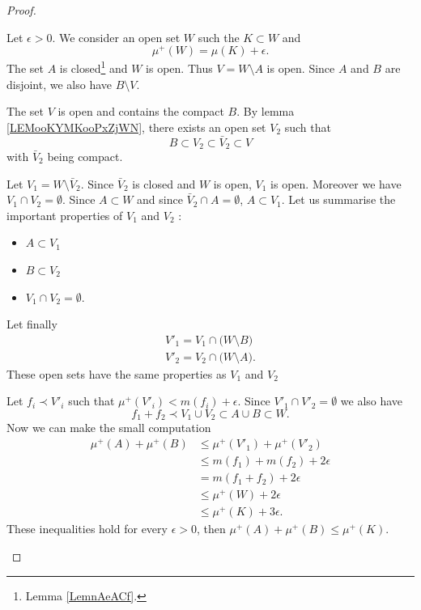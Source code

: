 \begin{proof}
\begin{subproof}
		Let \( \epsilon>0\). We consider an open set \( W\) such the \( K\subset W\) and
		\begin{equation}
			\mu^+(W)=\mu(K)+\epsilon.
		\end{equation}
		The set \( A\) is closed\footnote{Lemma \ref{LemnAeACf}.} and \( W\) is open. Thus \( V=W\setminus A\) is open. Since \( A\) and \( B\) are disjoint, we also have \( B\setminus V\).

		The set \( V\) is open and contains the compact \( B\). By lemma \ref{LEMooKYMKooPxZjWN}, there exists an open set \( V_2\) such that
		\begin{equation}
			B\subset V_2\subset \bar V_2\subset V
		\end{equation}
		with \( \bar V_2\) being compact.

		Let \( V_1=W\setminus \bar V_2\). Since \(  \bar V_2\) is closed and \( W\) is open, \( V_1\) is open. Moreover we have \( V_1\cap V_2=\emptyset\). Since \( A\subset W\) and since \( \bar V_2\cap A=\emptyset\), \( A\subset V_1\). Let us summarise the important properties of \( V_1\) and \( V_2\) :
		\begin{itemize}
			\item \( A\subset V_1\)
			\item \( B\subset V_2\)
			\item \( V_1\cap V_2=\emptyset\).
		\end{itemize}
		Let finally
		\begin{subequations}
			\begin{align}
				V'_1=V_1\cap\big( W\setminus B \big) \\
				V'_2=V_2\cap\big( W\setminus A \big).
			\end{align}
		\end{subequations}
		These open sets have the same properties as \( V_1\) and \( V_2\)

		Let \( f_i\prec V'_i\) such that \( \mu^+(V'_i)<m(f_i)+\epsilon\). Since \( V'_1\cap V'_2=\emptyset\) we also have
		\begin{equation}
			f_1+f_2\prec V_1\cup V_2\subset A\cup B\subset W.
		\end{equation}
		Now we can make the small computation
		\begin{subequations}
			\begin{align}
				\mu^+(A)+\mu^+(B) & \leq \mu^+(V'_1)+\mu^+(V'_2) \\
				                  & \leq m(f_1)+m(f_2)+2\epsilon \\
				                  & =m(f_1+f_2)+2\epsilon        \\
				                  & \leq \mu^+(W)+2\epsilon      \\
				                  & \leq \mu^+(K)+3\epsilon.
			\end{align}
		\end{subequations}
		These inequalities hold for every \( \epsilon>0\), then \( \mu^+(A)+\mu^+(B)\leq \mu^+(K)\).


\end{subproof}
\end{proof}
